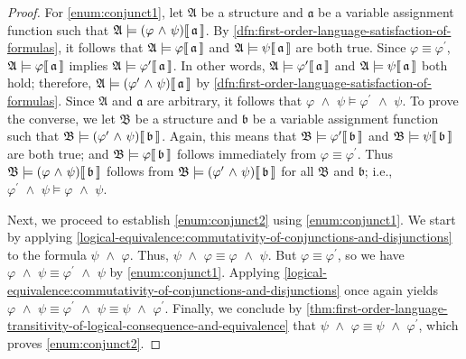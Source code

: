 \begin{proof}
    For \ref{enum:conjunct1}, let \( \mathfrak{A} \) be a structure and \( \mathfrak{a} \) be a variable assignment function such that
    \( \folwffsatisfaction{\mathfrak{A}}{\mleft( \varphi \,\,{\land}\,\, \psi \mright)}{\mathfrak{a}} \).
    By \cref{dfn:first-order-language-satisfaction-of-formulas}, it follows that \(  \mathfrak{A} \models \varphi\llbracket\, \mathfrak{a} \,\rrbracket \)
    and \(  \mathfrak{A} \models \psi\llbracket\, \mathfrak{a} \,\rrbracket \) are both true.
    Since \( \varphi \equiv \varphi^{\prime} \), \(  \mathfrak{A} \models \varphi\llbracket\, \mathfrak{a} \,\rrbracket \)
    implies \(  \mathfrak{A} \models \varphi^{\prime}\llbracket\, \mathfrak{a} \,\rrbracket \).
    In other words, \(  \mathfrak{A} \models \varphi^{\prime}\llbracket\, \mathfrak{a} \,\rrbracket \) and \(  \mathfrak{A} \models \psi\llbracket\, \mathfrak{a} \,\rrbracket \) both hold;
    therefore, \( \folwffsatisfaction{\mathfrak{A}}{\mleft( \varphi^{\prime} \,\,{\land}\,\, \psi \mright)}{\mathfrak{a}} \)
    by \cref{dfn:first-order-language-satisfaction-of-formulas}.
    Since \( \mathfrak{A} \) and \( \mathfrak{a} \) are arbitrary, it follows that \( \varphi \,\,{\land}\,\, \psi \models \varphi^{\prime} \,\,{\land}\,\, \psi \).
    To prove the converse, we let \( \mathfrak{B} \) be a structure and \( \mathfrak{b} \) be a variable assignment function such that
    \( \folwffsatisfaction{\mathfrak{B}}{\mleft( \varphi^{\prime} \,\,{\land}\,\, \psi \mright)}{\mathfrak{b}} \). Again, this means that
    \(  \mathfrak{B} \models \varphi^{\prime}\llbracket\, \mathfrak{b} \,\rrbracket \) and \(  \mathfrak{B} \models \psi\llbracket\, \mathfrak{b} \,\rrbracket \) are both true;
    and \(  \mathfrak{B} \models \varphi\llbracket\, \mathfrak{b} \,\rrbracket \) follows immediately from \( \varphi \equiv \varphi^{\prime} \).
    Thus \( \folwffsatisfaction{\mathfrak{B}}{\mleft( \varphi \,\,{\land}\,\, \psi \mright)}{\mathfrak{b}} \) follows from
    \( \folwffsatisfaction{\mathfrak{B}}{\mleft( \varphi^{\prime} \,\,{\land}\,\, \psi \mright)}{\mathfrak{b}} \) for all \( \mathfrak{B} \) and \( \mathfrak{b} \);
    i.e., \( \varphi^{\prime} \,\,{\land}\,\, \psi \models \varphi \,\,{\land}\,\, \psi \).

    \vspace{0.3cm}
    \noindent
    Next, we proceed to establish \ref{enum:conjunct2} using \ref{enum:conjunct1}.
    We start by applying \cref{logical-equivalence:commutativity-of-conjunctions-and-disjunctions} to the formula \( \psi \,\,{\land}\,\, \varphi \).
    Thus, \( \psi \,\,{\land}\,\, \varphi \equiv \varphi \,\,{\land}\,\, \psi \). But \( \varphi \equiv \varphi^{\prime} \), so we have
    \( \varphi \,\,{\land}\,\, \psi \equiv \varphi^{\prime} \,\,{\land}\,\, \psi \) by \ref{enum:conjunct1}.
    Applying \cref{logical-equivalence:commutativity-of-conjunctions-and-disjunctions} once again yields
    \( \varphi \,\,{\land}\,\, \psi \equiv \varphi^{\prime} \,\,{\land}\,\, \psi \equiv \psi \,\,{\land}\,\, \varphi^{\prime} \).
    Finally, we conclude by \cref{thm:first-order-language-transitivity-of-logical-consequence-and-equivalence} that
    \( \psi \,\,{\land}\,\, \varphi \equiv \psi \,\,{\land}\,\, \varphi^{\prime} \), which proves \ref{enum:conjunct2}.


\end{proof}
